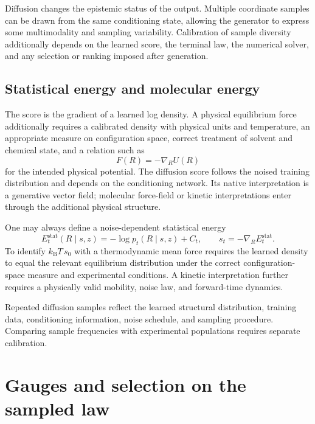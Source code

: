 Diffusion changes the epistemic status of the output.  Multiple coordinate samples can be drawn
from the same conditioning state, allowing the generator to express some multimodality and sampling
variability.  Calibration of sample diversity additionally depends on the learned score, the
terminal law, the numerical solver, and any selection or ranking imposed after generation.

\subsection{Statistical energy and molecular energy}

The score is the gradient of a learned log density.  A physical equilibrium force additionally
requires a calibrated density with physical units and temperature, an appropriate measure on
configuration space, correct treatment of solvent and chemical state, and a relation such as
\begin{equation}
F(R)=-\nabla_R U(R)
\end{equation}
for the intended physical potential.  The diffusion score follows the noised training distribution
and depends on the conditioning network.  Its native interpretation is a generative vector field;
molecular force-field or kinetic interpretations enter through the additional physical structure.

One may always define a noise-dependent statistical energy
\begin{equation}
E_t^{\mathrm{stat}}(R\mid s,z)=-\log p_t(R\mid s,z)+C_t,
\qquad
s_t=-\nabla_RE_t^{\mathrm{stat}}.
\label{eq:book-af3-statistical-energy}
\end{equation}
To identify $k_{\mathrm B}T\,s_0$ with a thermodynamic mean force requires the learned density to
equal the relevant equilibrium distribution under the correct configuration-space measure and
experimental conditions.  A kinetic interpretation further requires a physically valid mobility,
noise law, and forward-time dynamics.

Repeated diffusion samples reflect the learned structural distribution, training data,
conditioning information, noise schedule, and sampling procedure.  Comparing sample frequencies
with experimental populations requires separate calibration.

\section{Gauges and selection on the sampled law}
\label{sec:book-gauges-selection}

